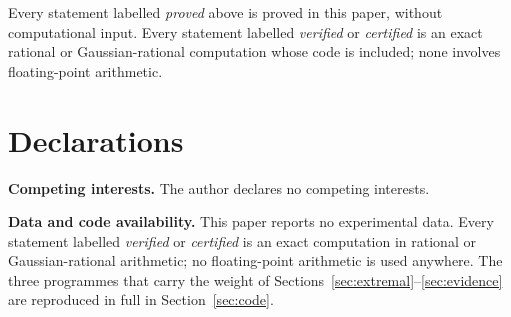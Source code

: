 \documentclass[12pt]{amsart}
\theoremstyle{definition}
\theoremstyle{remark}
\begin{document}
Every statement labelled \emph{proved} above is proved in this paper, without computational input.  Every statement labelled \emph{verified} or \emph{certified} is an exact rational or Gaussian-rational computation whose code is included; none involves floating-point arithmetic.

\section*{Declarations}

\noindent\textbf{Competing interests.}  The author declares no competing
interests.

\smallskip
\noindent\textbf{Data and code availability.}  This paper reports no experimental data.  Every statement labelled \emph{verified} or \emph{certified} is an exact computation in rational or Gaussian-rational arithmetic; no floating-point arithmetic is used anywhere.  The three programmes that carry the weight of Sections~\ref{sec:extremal}--\ref{sec:evidence} are reproduced in full in Section~\ref{sec:code}.
\end{document}
